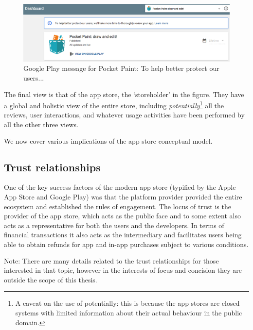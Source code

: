 \begin{figure}[htbp!]
    \centering
    \includegraphics[width=15cm]{images/android-vitals-screenshots/pocketpaint-to-help-better-protect-users.png}
    \caption{Google Play message for Pocket Paint: To help better protect our users...}
    \label{fig:pocketpaint-to-help-better-protect-users}
\end{figure}

The final view is that of the app store, the `storeholder' in the figure. They have a global and holistic view of the entire store, including \textit{potentially}\footnote{A caveat on the use of potentially: this is because the app stores are closed systems with limited information about their actual behaviour in the public domain.} all the reviews, user interactions, and whatever usage activities have been performed by all the other three views. 

We now cover various implications of the app store conceptual model.

\subsection{Trust relationships}
One of the key success factors of the modern app store (typified by the Apple App Store and Google Play) was that the platform provider provided the entire ecosystem and established the rules of engagement. The locus of trust is the provider of the app store, which acts as the public face and to some extent also acts as a representative for both the users and the developers. In terms of financial transactions it also acts as the intermediary and facilitates users being able to obtain refunds for app and in-app purchases subject to various conditions. 

Note: There are many details related to the trust relationships for those interested in that topic, however in the interests of focus and concision they are outside the scope of this thesis. 

